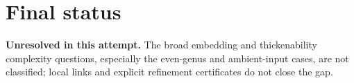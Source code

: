 \documentclass[11pt]{article}
\begin{document}
\section{Final status}
\textbf{Unresolved in this attempt.} The broad embedding and thickenability complexity questions, especially the even-genus and ambient-input cases, are not classified; local links and explicit refinement certificates do not close the gap.
\end{document}
